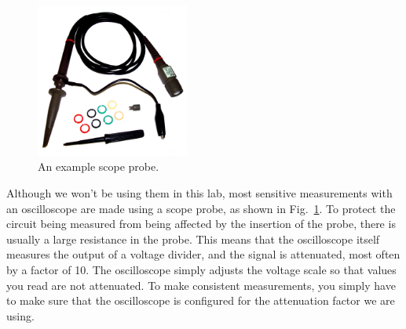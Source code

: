 \begin{figure}[htbp]
\begin{center}
\includegraphics[width=0.45\textwidth]{figs/labs/lissajous/probe.jpg} 
\caption{An example scope probe.}
\label{fig:probe}
\end{center}
\end{figure}

Although we won't be using them in this lab, most sensitive
measurements with an oscilloscope are made using a scope probe, as
shown in Fig.~\ref{fig:probe}.  To protect the circuit being measured
from being affected by the insertion of the probe, there is usually a
large resistance in the probe.  This means that the oscilloscope
itself measures the output of a voltage divider, and the signal is
attenuated, most often by a factor of 10.  The oscilloscope simply
adjusts the voltage scale so that values you read are not attenuated.
To make consistent measurements, you simply have to make sure that the
oscilloscope is configured for the attenuation factor we are using.

